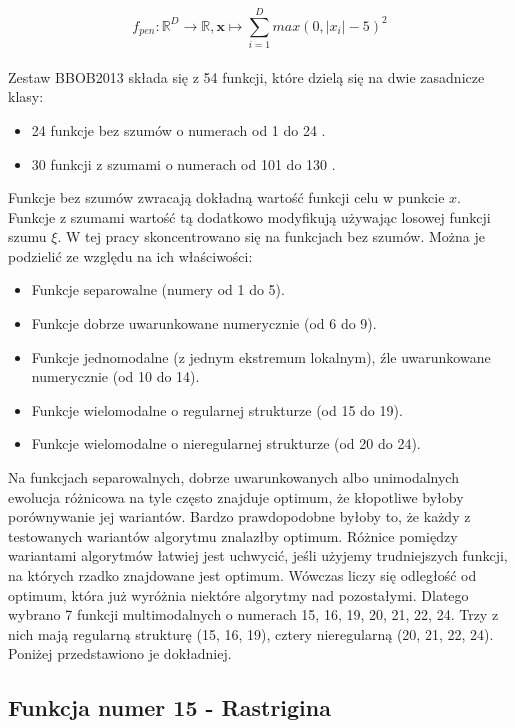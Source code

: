 \documentclass[a4paper,onecolumn,oneside,11pt,wide,floatssmall]{mwrep}
\theoremstyle{definition}
\theoremstyle{plain}%
\theoremstyle{remark}
\begin{document}
$$ f_{pen} : \mathbb{R}^D \rightarrow \mathbb{R}, 
\textbf{x} \mapsto \sum\limits_{i=1}^D max(0, |x_i| - 5)^2 $$ 
\\
Zestaw BBOB2013 składa się z 54 funkcji, które dzielą się na dwie zasadnicze klasy:

\begin{itemize}
 \item 24 funkcje bez szumów o numerach od 1 do 24 \cite{noiseless}. 
 \item 30 funkcji z szumami o numerach od 101 do 130 \cite{noisy}.
\end{itemize} 

Funkcje bez szumów zwracają dokładną wartość funkcji celu w punkcie $x$. Funkcje z szumami wartość tą dodatkowo modyfikują używając 
losowej funkcji szumu $\xi$. W tej pracy skoncentrowano się na funkcjach bez szumów. Można je podzielić ze względu
na ich właściwości:

\begin{itemize}
 \item Funkcje separowalne (numery od 1 do 5).
 \item Funkcje dobrze uwarunkowane numerycznie (od 6 do 9).
 \item Funkcje jednomodalne (z jednym ekstremum lokalnym), źle uwarunkowane numerycznie (od 10 do 14).
 \item Funkcje wielomodalne o regularnej strukturze (od 15 do 19).
 \item Funkcje wielomodalne o nieregularnej strukturze (od 20 do 24).
\end{itemize} 

Na funkcjach separowalnych, dobrze uwarunkowanych albo unimodalnych ewolucja różnicowa na tyle często znajduje optimum, że kłopotliwe
byłoby porównywanie jej wariantów. Bardzo prawdopodobne byłoby to, że każdy z testowanych wariantów algorytmu znalazłby optimum. 
Różnice pomiędzy wariantami algorytmów łatwiej jest uchwycić, jeśli użyjemy trudniejszych funkcji, na których rzadko znajdowane jest 
optimum. Wówczas liczy się odległość od optimum, która już wyróżnia niektóre algorytmy nad pozostałymi. Dlatego wybrano 7 funkcji 
multimodalnych o numerach 15, 16, 19, 20, 21, 22, 24. Trzy z nich mają regularną strukturę (15, 16, 19), cztery nieregularną (20, 21, 22, 24).
Poniżej przedstawiono je dokładniej.

\subsection{Funkcja numer 15 - Rastrigina}
\end{document}
